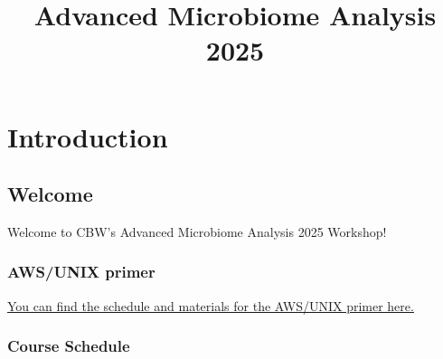 \documentclass[
]{book}
\title{Advanced Microbiome Analysis 2025}
\author{}
\date{\vspace{-2.5em}}
\begin{document}
\maketitle

{
\setcounter{tocdepth}{1}
\tableofcontents
}
\part{Introduction}\label{part-introduction}

\chapter{Welcome}\label{welcome}

Welcome to CBW's Advanced Microbiome Analysis 2025 Workshop!

\section{AWS/UNIX primer}\label{awsunix-primer}

\href{https://bioinformaticsdotca.github.io/AWS_2025}{You can find the schedule and materials for the AWS/UNIX primer here.}

\section{Course Schedule}\label{course-schedule}
\end{document}
